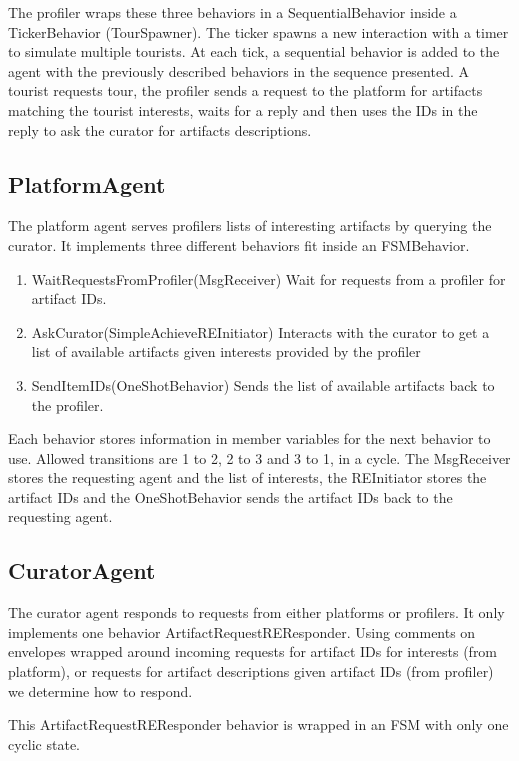 \documentclass[a4paper, 11pt]{article}
\begin{document}
The profiler wraps these three behaviors in a SequentialBehavior inside a TickerBehavior (TourSpawner). The ticker spawns a new interaction with a timer to simulate multiple tourists. At each tick, a sequential behavior is added to the agent with the previously described behaviors in the sequence presented. A tourist requests tour, the profiler sends a request to the platform for artifacts matching the tourist interests, waits for a reply and then uses the IDs in the reply to ask the curator for artifacts descriptions.

\subsection{PlatformAgent}
The platform agent serves profilers lists of interesting artifacts by querying the curator. It implements three different behaviors fit inside an FSMBehavior.

\begin{enumerate}
\item WaitRequestsFromProfiler(MsgReceiver) Wait for requests from a profiler for artifact IDs.
\item AskCurator(SimpleAchieveREInitiator) Interacts with the curator to get a list of available artifacts given interests provided by the profiler 
\item SendItemIDs(OneShotBehavior) Sends the list of available artifacts back to the profiler.
\end{enumerate}

Each behavior stores information in member variables for the next behavior to use. Allowed transitions are 1 to 2, 2 to 3 and 3 to 1, in a cycle. The MsgReceiver stores the requesting agent and the list of interests, the REInitiator stores the 
artifact IDs and the OneShotBehavior sends the artifact IDs back to the requesting agent.

\subsection{CuratorAgent}
The curator agent responds to requests from either platforms or profilers. It only implements one behavior ArtifactRequestREResponder. Using comments on envelopes wrapped around incoming requests for artifact IDs for interests (from platform), or requests for artifact descriptions given artifact IDs (from profiler) we determine how to respond.

This ArtifactRequestREResponder behavior is wrapped in an FSM with only one cyclic state.
\end{document}
